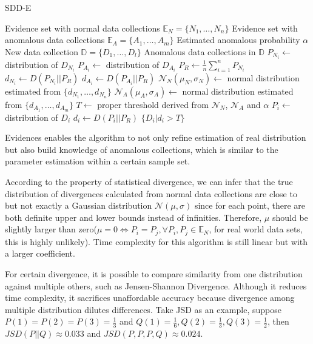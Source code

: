 \documentclass{article}
\begin{document}
			\begin{algorithm}[!t]
				\caption{SDD-E}
				\label{alg:sdd-e}
				\begin{algorithmic}[1]
					\Require Evidence set with normal data collections $\mathbb{E}_N = \{N_1, \dots, N_n\}$
					\Require Evidence set with anomalous data collections $\mathbb{E}_A = \{A_1, \dots, A_m\}$
					\Require Estimated anomalous probability $\alpha$
					\Require New data collection $\mathbb{D} = \{D_1, \dots, D_l\}$
					\Ensure Anomalous data collections in $\mathbb{D}$
					\State $P_{N_i} \gets$ distribution of $D_{N_i}$\label{line:hist-1}
					\EndFor
					\State $P_{A_i} \gets$ distribution of $D_{A_i}$\label{line:hist-2}
					\EndFor
					\State $P_R \gets \frac{1}{n}\sum_{i=1}^{n}P_{N_i}$
					\State $d_{N_i} \gets D(P_{N_i}||P_R)$
					\EndFor
					\State $d_{A_i} \gets D(P_{A_i}||P_R)$
					\EndFor
					\State $\mathcal{N}_N(\mu_N, \sigma_N) \gets$ normal distribution estimated from $\{d_{N_1}, \dots, d_{N_n}\}$
					\State $\mathcal{N}_A(\mu_A, \sigma_A) \gets$  normal distribution estimated from $\{d_{A_1}, \dots, d_{A_m}\}$
					\State $T \gets$ proper threshold derived from $\mathcal{N}_N$, $\mathcal{N}_A$ and $\alpha$
					\State $P_i \gets$ distribution of $D_i$
					\State $d_i \gets D(P_i||P_R)$
					\EndFor
					\State \Return $\{D_i|d_i > T\}$
				\end{algorithmic}
			\end{algorithm}
	
			Evidences enables the algorithm to not only refine estimation of real distribution but also build knowledge of anomalous collections, which is similar to the parameter estimation within a certain sample set.
			
			According to the property of statistical divergence, we can infer that the true distribution of divergences calculated from normal data collections are close to but not exactly a Gaussian distribution $\mathcal{N}(\mu, \sigma)$ since for each point, there are both definite upper and lower bounds instead of infinities. Therefore, $\mu$ should be slightly larger than zero($\mu = 0 \iff P_i = P_j, \forall P_i, P_j \in \mathbb{E}_N$, for real world data sets, this is highly unlikely). Time complexity for this algorithm is still linear but with a larger coefficient.
			
			For certain divergence, it is possible to compare similarity from one distribution against multiple others, such as Jensen-Shannon Divergence. Although it reduces time complexity, it sacrifices unaffordable accuracy because divergence among multiple distribution dilutes differences. Take JSD as an example, suppose $P(1) = P(2) = P(3) = \frac{1}{3}$ and $Q(1) = \frac{1}{6}, Q(2) = \frac{1}{3}, Q(3) = \frac{1}{2}$, then $JSD(P||Q) \approx 0.033$ and $JSD(P, P, P, Q) \approx 0.024$.
			
\end{document}
